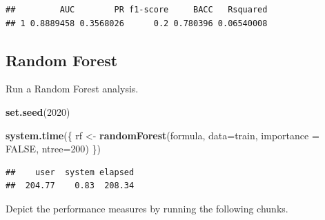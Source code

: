 \documentclass[]{article}
\newenvironment{Shaded}{\begin{snugshade}}{\end{snugshade}}
\newcommand{\DataTypeTok}[1]{\textcolor[rgb]{0.13,0.29,0.53}{#1}}
\newcommand{\DecValTok}[1]{\textcolor[rgb]{0.00,0.00,0.81}{#1}}
\newcommand{\KeywordTok}[1]{\textcolor[rgb]{0.13,0.29,0.53}{\textbf{#1}}}
\newcommand{\NormalTok}[1]{#1}
\newcommand{\OperatorTok}[1]{\textcolor[rgb]{0.81,0.36,0.00}{\textbf{#1}}}
\newcommand{\OtherTok}[1]{\textcolor[rgb]{0.56,0.35,0.01}{#1}}
\newcommand{\StringTok}[1]{\textcolor[rgb]{0.31,0.60,0.02}{#1}}
\begin{document}
\begin{Shaded}
\end{Shaded}

\begin{verbatim}
##         AUC        PR f1-score     BACC   Rsquared
## 1 0.8889458 0.3568026      0.2 0.780396 0.06540008
\end{verbatim}

\hypertarget{random-forest}{%
\subsection{Random Forest}\label{random-forest}}

Run a Random Forest analysis.

\begin{Shaded}
\begin{Highlighting}[]
\KeywordTok{set.seed}\NormalTok{(}\DecValTok{2020}\NormalTok{)}

\KeywordTok{system.time}\NormalTok{(\{}
\NormalTok{rf <-}\StringTok{ }\KeywordTok{randomForest}\NormalTok{(formula, }\DataTypeTok{data=}\NormalTok{train,}
                   \DataTypeTok{importance =} \OtherTok{FALSE}\NormalTok{,}
                   \DataTypeTok{ntree=}\DecValTok{200}\NormalTok{)}
\NormalTok{\})}
\end{Highlighting}
\end{Shaded}

\begin{verbatim}
##    user  system elapsed 
##  204.77    0.83  208.34
\end{verbatim}

Depict the performance measures by running the following chunks.
\end{document}

